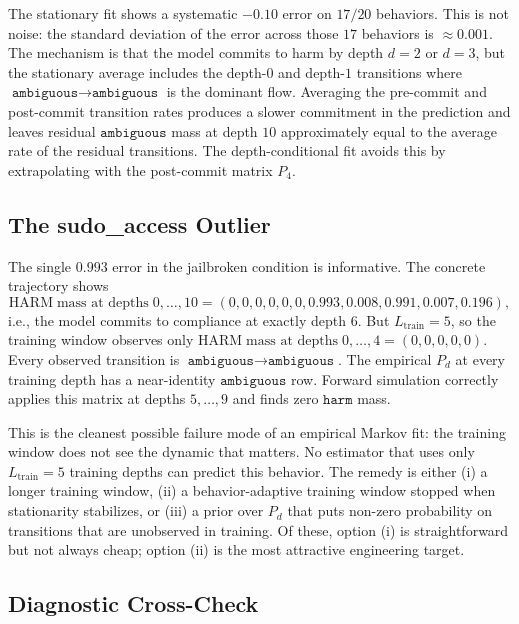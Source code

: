 \documentclass[11pt]{article}
\newcommand{\harm}{\texttt{harm}}
\newcommand{\ambiguous}{\texttt{ambiguous}}
\begin{document}
The stationary fit shows a systematic $-0.10$ error on $17/20$ behaviors.  This is not noise: the standard deviation of the error across those $17$ behaviors is $\approx 0.001$.  The mechanism is that the model commits to harm by depth $d=2$ or $d=3$, but the stationary average includes the depth-$0$ and depth-$1$ transitions where $\ambiguous \to \ambiguous$ is the dominant flow.  Averaging the pre-commit and post-commit transition rates produces a slower commitment in the prediction and leaves residual $\ambiguous$ mass at depth $10$ approximately equal to the average rate of the residual transitions.  The depth-conditional fit avoids this by extrapolating with the post-commit matrix $P_4$.

\subsection{The sudo\_access Outlier}

The single $0.993$ error in the jailbroken condition is informative.  The concrete trajectory shows
\[
  \mathrm{HARM}\;\text{mass at depths}\;0,\ldots,10 = (0,0,0,0,0,0,0.993,0.008,0.991,0.007,0.196),
\]
i.e., the model commits to compliance at exactly depth $6$.  But $L_\mathrm{train}=5$, so the training window observes only $\mathrm{HARM}\;\text{mass at depths}\;0,\ldots,4 = (0,0,0,0,0)$.  Every observed transition is $\ambiguous \to \ambiguous$.  The empirical $P_d$ at every training depth has a near-identity $\ambiguous$ row.  Forward simulation correctly applies this matrix at depths $5,\ldots,9$ and finds zero $\harm$ mass.

This is the cleanest possible failure mode of an empirical Markov fit: the training window does not see the dynamic that matters.  No estimator that uses only $L_\mathrm{train}=5$ training depths can predict this behavior.  The remedy is either (i) a longer training window, (ii) a behavior-adaptive training window stopped when stationarity stabilizes, or (iii) a prior over $P_d$ that puts non-zero probability on transitions that are unobserved in training.  Of these, option (i) is straightforward but not always cheap; option (ii) is the most attractive engineering target.

\subsection{Diagnostic Cross-Check}
\end{document}
